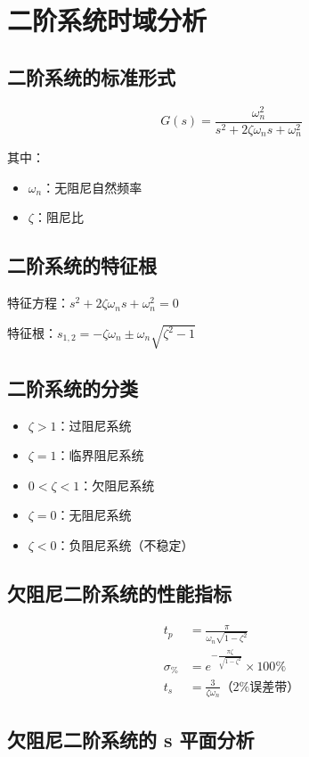\section{二阶系统时域分析}

\subsection{二阶系统的标准形式}
\[G(s) = \frac{\omega_n^2}{s^2 + 2\zeta\omega_n s + \omega_n^2}\]

其中：
\begin{itemize}
    \item $\omega_n$：无阻尼自然频率
    \item $\zeta$：阻尼比
\end{itemize}

\subsection{二阶系统的特征根}
特征方程：$s^2 + 2\zeta\omega_n s + \omega_n^2 = 0$

特征根：$s_{1,2} = -\zeta\omega_n \pm \omega_n\sqrt{\zeta^2 - 1}$

\subsection{二阶系统的分类}
\begin{itemize}
    \item $\zeta > 1$：过阻尼系统
    \item $\zeta = 1$：临界阻尼系统
    \item $0 < \zeta < 1$：欠阻尼系统
    \item $\zeta = 0$：无阻尼系统
    \item $\zeta < 0$：负阻尼系统（不稳定）
\end{itemize}

\subsection{欠阻尼二阶系统的性能指标}
\begin{align}
t_p &= \frac{\pi}{\omega_n\sqrt{1-\zeta^2}} \\
\sigma_{\%} &= e^{-\frac{\pi\zeta}{\sqrt{1-\zeta^2}}} \times 100\% \\
t_s &= \frac{3}{\zeta\omega_n} \text{（2\%误差带）}
\end{align}

\subsection{欠阻尼二阶系统的 s 平面分析}

